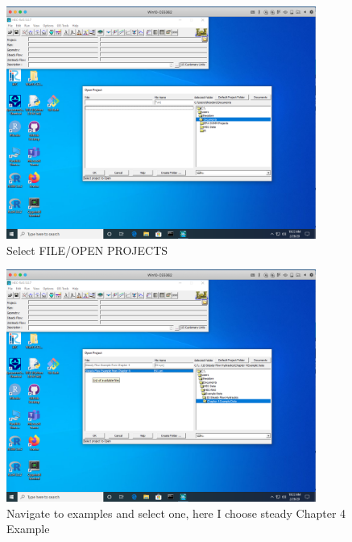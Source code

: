 \begin{figure}[h!] %
   \centering
   \includegraphics[width=4in]{file-open-projects.png} 
   \caption{Select FILE/OPEN PROJECTS}
   \label{fig:file-open-projects}
\end{figure}


\begin{figure}[h!] %
   \centering
   \includegraphics[width=4in]{navigate-projects-select.png} 
   \caption{Navigate to examples and select one, here I choose steady Chapter 4 Example}
   \label{fig:navigate-projects-select}
\end{figure}

\clearpage

